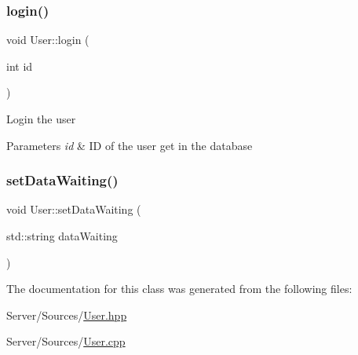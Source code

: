 \subsubsection{\texorpdfstring{login()}{login()}}
{\footnotesize\ttfamily void User\+::login (\begin{DoxyParamCaption}\item[{int}]{id }\end{DoxyParamCaption})}

Login the user 
\begin{DoxyParams}{Parameters}
{\em id} & ID of the user get in the database \\
\hline
\end{DoxyParams}
\mbox{\label{classUser_a893e59448e3e3b7da39daf6caa631ade}} 
\subsubsection{\texorpdfstring{set\+Data\+Waiting()}{setDataWaiting()}}
{\footnotesize\ttfamily void User\+::set\+Data\+Waiting (\begin{DoxyParamCaption}\item[{std\+::string}]{data\+Waiting }\end{DoxyParamCaption})\hspace{0.3cm}{\ttfamily [inline]}}



The documentation for this class was generated from the following files\+:\begin{DoxyCompactItemize}
\item 
Server/\+Sources/\hyperlink{User_8hpp}{User.\+hpp}\item 
Server/\+Sources/\hyperlink{User_8cpp}{User.\+cpp}\end{DoxyCompactItemize}
